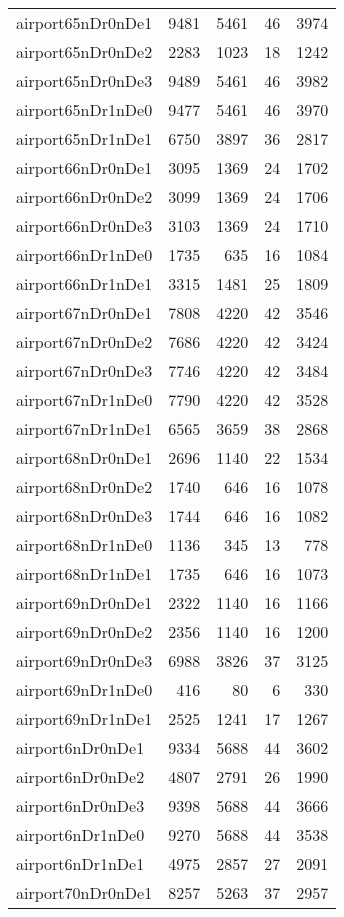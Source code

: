\begin{longtable}{lrrrr}
airport65nDr0nDe1 & 9481 & 5461 & 46 & 3974 \\
airport65nDr0nDe2 & 2283 & 1023 & 18 & 1242 \\
airport65nDr0nDe3 & 9489 & 5461 & 46 & 3982 \\
airport65nDr1nDe0 & 9477 & 5461 & 46 & 3970 \\
airport65nDr1nDe1 & 6750 & 3897 & 36 & 2817 \\
airport66nDr0nDe1 & 3095 & 1369 & 24 & 1702 \\
airport66nDr0nDe2 & 3099 & 1369 & 24 & 1706 \\
airport66nDr0nDe3 & 3103 & 1369 & 24 & 1710 \\
airport66nDr1nDe0 & 1735 & 635 & 16 & 1084 \\
airport66nDr1nDe1 & 3315 & 1481 & 25 & 1809 \\
airport67nDr0nDe1 & 7808 & 4220 & 42 & 3546 \\
airport67nDr0nDe2 & 7686 & 4220 & 42 & 3424 \\
airport67nDr0nDe3 & 7746 & 4220 & 42 & 3484 \\
airport67nDr1nDe0 & 7790 & 4220 & 42 & 3528 \\
airport67nDr1nDe1 & 6565 & 3659 & 38 & 2868 \\
airport68nDr0nDe1 & 2696 & 1140 & 22 & 1534 \\
airport68nDr0nDe2 & 1740 & 646 & 16 & 1078 \\
airport68nDr0nDe3 & 1744 & 646 & 16 & 1082 \\
airport68nDr1nDe0 & 1136 & 345 & 13 & 778 \\
airport68nDr1nDe1 & 1735 & 646 & 16 & 1073 \\
airport69nDr0nDe1 & 2322 & 1140 & 16 & 1166 \\
airport69nDr0nDe2 & 2356 & 1140 & 16 & 1200 \\
airport69nDr0nDe3 & 6988 & 3826 & 37 & 3125 \\
airport69nDr1nDe0 & 416 & 80 & 6 & 330 \\
airport69nDr1nDe1 & 2525 & 1241 & 17 & 1267 \\
airport6nDr0nDe1 & 9334 & 5688 & 44 & 3602 \\
airport6nDr0nDe2 & 4807 & 2791 & 26 & 1990 \\
airport6nDr0nDe3 & 9398 & 5688 & 44 & 3666 \\
airport6nDr1nDe0 & 9270 & 5688 & 44 & 3538 \\
airport6nDr1nDe1 & 4975 & 2857 & 27 & 2091 \\
airport70nDr0nDe1 & 8257 & 5263 & 37 & 2957 \\

\end{longtable}
